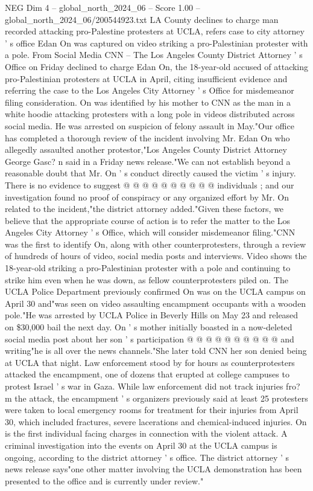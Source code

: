 \begin{textsample}{NEG Dim 4 – global\_north\_2024\_06 – Score 1.00 – global\_north\_2024\_06/200544923.txt}  \label{ex:f4_neg_317}
LA County declines to charge man recorded attacking pro-Palestine protesters at UCLA, refers case to city attorney ' s office Edan On was captured on video striking a pro-Palestinian protester with a pole.
From Social Media CNN -- The Los Angeles County District Attorney ' s Office on Friday declined to charge Edan On, the 18-year-old accused of attacking pro-Palestinian protesters at UCLA in April, citing insufficient evidence and referring the case to the Los Angeles City Attorney ' s Office for misdemeanor filing consideration.
On was identified by his mother to CNN as the man in a white hoodie attacking protesters with a long pole in videos distributed across social media.
He was arrested on suspicion of felony assault in May."Our office has completed a thorough review of the incident involving Mr.
Edan On who allegedly assaulted another protestor,"Los Angeles County District Attorney George Gasc? n said in a Friday news release."We can not establish beyond a reasonable doubt that Mr.
On ' s conduct directly caused the victim ' s injury.
There is no evidence to suggest @ @ @ @ @ @ @ @ @ @ individuals ; and our investigation found no proof of conspiracy or any organized effort by Mr.
On related to the incident,"the district attorney added."Given these factors, we believe that the appropriate course of action is to refer the matter to the Los Angeles City Attorney ' s Office, which will consider misdemeanor filing."CNN was the first to identify On, along with other counterprotesters, through a review of hundreds of hours of video, social media posts and interviews.
Video shows the 18-year-old striking a pro-Palestinian protester with a pole and continuing to strike him even when he was down, as fellow counterprotesters piled on.
The UCLA Police Department previously confirmed On was on the UCLA campus on April 30 and"was seen on video assaulting encampment occupants with a wooden pole."He was arrested by UCLA Police in Beverly Hills on May 23 and released on \$30,000 bail the next day.
On ' s mother initially boasted in a now-deleted social media post about her son ' s participation @ @ @ @ @ @ @ @ @ @ and writing"he is all over the news channels."She later told CNN her son denied being at UCLA that night.
Law enforcement stood by for hours as counterprotesters attacked the encampment, one of dozens that erupted at college campuses to protest Israel ' s war in Gaza.
While law enforcement did not track injuries fro? m the attack, the encampment ' s organizers previously said at least 25 protesters were taken to local emergency rooms for treatment for their injuries from April 30, which included fractures, severe lacerations and chemical-induced injuries.
On is the first individual facing charges in connection with the violent attack.
A criminal investigation into the events on April 30 at the UCLA campus is ongoing, according to the district attorney ' s office.
The district attorney ' s news release says"one other matter involving the UCLA demonstration has been presented to the office and is currently under review."

\end{textsample}
